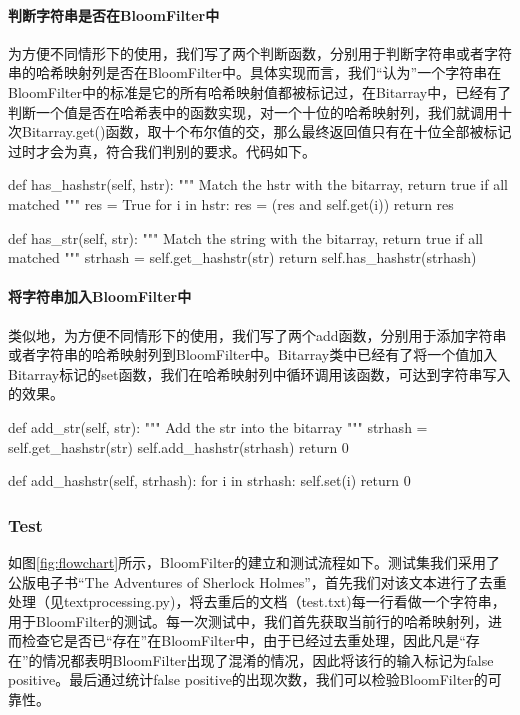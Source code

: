 \documentclass{article}
\begin{document}
\paragraph{判断字符串是否在BloomFilter中}
为方便不同情形下的使用，我们写了两个判断函数，分别用于判断字符串或者字符串的哈希映射列是否在BloomFilter中。具体实现而言，我们“认为”一个字符串在BloomFilter中的标准是它的所有哈希映射值都被标记过，在Bitarray中，已经有了判断一个值是否在哈希表中的函数实现，对一个十位的哈希映射列，我们就调用十次Bitarray.get()函数，取十个布尔值的交，那么最终返回值只有在十位全部被标记过时才会为真，符合我们判别的要求。代码如下。
\begin{python}
def has_hashstr(self, hstr):
    """ Match the hstr with the bitarray, return true if all matched """
    res = True
    for i in hstr:
        res = (res and self.get(i))
    return res

def has_str(self, str):
    """ Match the string with the bitarray, return true if all matched """
    strhash = self.get_hashstr(str)
    return self.has_hashstr(strhash)
\end{python}

\paragraph{将字符串加入BloomFilter中}
类似地，为方便不同情形下的使用，我们写了两个add函数，分别用于添加字符串或者字符串的哈希映射列到BloomFilter中。Bitarray类中已经有了将一个值加入Bitarray标记的set函数，我们在哈希映射列中循环调用该函数，可达到字符串写入的效果。
\begin{python}
def add_str(self, str):
    """ Add the str into the bitarray """
    strhash = self.get_hashstr(str)
    self.add_hashstr(strhash)
    return 0

def add_hashstr(self, strhash):
    for i in strhash:
        self.set(i)
    return 0
\end{python}


\subsubsection{Test}
如图\ref{fig:flowchart}所示，BloomFilter的建立和测试流程如下。测试集我们采用了公版电子书“The Adventures of Sherlock Holmes”，首先我们对该文本进行了去重处理（见textprocessing.py)，将去重后的文档（test.txt)每一行看做一个字符串，用于BloomFilter的测试。每一次测试中，我们首先获取当前行的哈希映射列，进而检查它是否已“存在”在BloomFilter中，由于已经过去重处理，因此凡是“存在”的情况都表明BloomFilter出现了混淆的情况，因此将该行的输入标记为false positive。最后通过统计false positive的出现次数，我们可以检验BloomFilter的可靠性。
\end{document}

